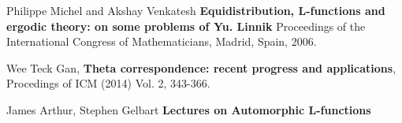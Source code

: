 \documentclass[12pt]{article}
\begin{document}
\vfill


\selectfont \fontsize{12}{10}\selectfont

\begin{thebibliography}{}

\item Philippe Michel and Akshay Venkatesh \textbf{Equidistribution, L-functions and ergodic theory: on some problems of Yu. Linnik} Proceedings of the International Congress
of Mathematicians, Madrid, Spain, 2006.

\item  Wee Teck Gan, \textbf{Theta correspondence: recent progress and applications}, Procedings of
ICM (2014) Vol. 2, 343-366.

\item James Arthur, Stephen Gelbart \textbf{Lectures on Automorphic L-functions}

\end{thebibliography}
\end{document}
